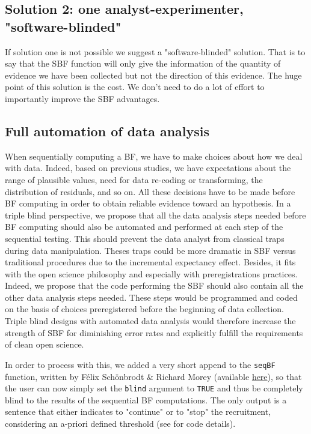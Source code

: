 \documentclass[a4paper,man,natbib,floatsintext,donotrepeattitle]{apa6}
\begin{document}
\subsection{Solution 2: one analyst-experimenter, "software-blinded"}
If solution one is not possible we suggest a "software-blinded" solution. That is to say that the SBF function will only give the information of the quantity of evidence we have been collected but not the direction of this evidence.  
The huge point of this solution is the cost. We don't need to do a lot of effort to importantly improve the SBF advantages. 

\subsection{Full automation of data analysis}
When sequentially computing a BF, we have to make choices about how we deal with data. Indeed, based on previous studies, we have expectations about the range of plausible values, need for data re-coding or transforming, the distribution of residuals, and so on. All these decisions have to be made before BF computing in order to obtain reliable evidence toward an hypothesis. In a triple blind perspective, we propose that all the data analysis steps needed before BF computing should also be automated and performed at each step of the sequential testing. This should prevent the data analyst from classical traps during data manipulation. Theses traps could be more dramatic in SBF versus traditional procedures due to the incremental expectancy effect. Besides, it fits with the open science philosophy and especially with preregistrations practices. Indeed, we propose that the code performing the SBF should also contain all the other data analysis steps needed. These steps would be programmed and coded on the basis of choices preregistered before the beginning of data collection. Triple blind designs with automated data analysis would therefore increase the strength of SBF for diminishing error rates and explicitly fulfill the requirements of clean open science. \par

In order to process with this, we added a very short append to the \texttt{seqBF} function, written by Félix Schönbrodt \& Richard Morey (available \href{https://raw.githubusercontent.com/richarddmorey/BayesFactorExtras/master/BayesFactorExtras/R/seqBF.R}{here}), so that the user can now simply set the \texttt{blind} argument to \texttt{TRUE} and thus be completely blind to the results of the sequential BF computations. The only output is a sentence that either indicates to "continue" or to "stop" the recruitment, considering an a-priori defined threshold (see  for code details).
\end{document}
